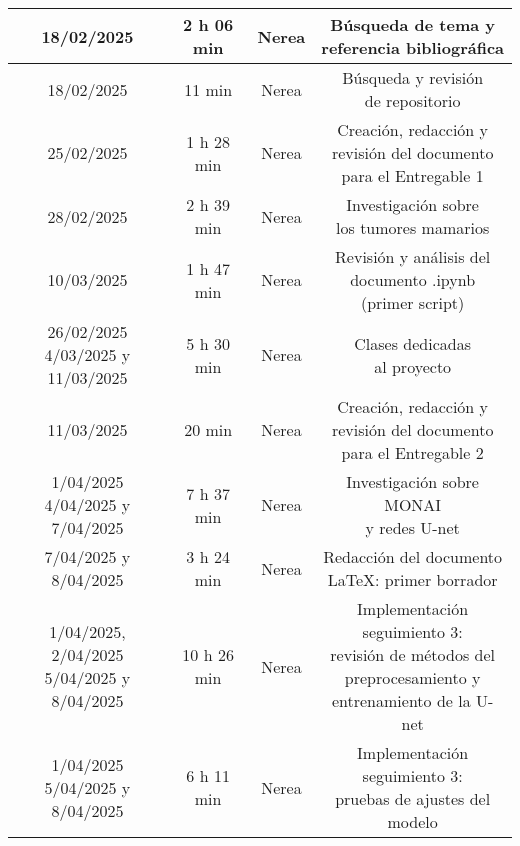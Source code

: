 \documentclass[12pt]{article}
\begin{document}
\begin{longtable}{|c|c|c|c|}
18/02/2025 & 2 h 06 min & Nerea & \makecell{Búsqueda de tema y \\ referencia bibliográfica} \\
\hline
18/02/2025 & 11 min & Nerea & \makecell{Búsqueda y revisión \\ de repositorio} \\
\hline
25/02/2025 & 1 h 28 min & Nerea & \makecell{Creación, redacción y \\ revisión del documento \\ para el Entregable 1} \\
\hline
28/02/2025 & 2 h 39 min & Nerea & \makecell{Investigación sobre \\ los tumores mamarios} \\
\hline
10/03/2025 & 1 h 47 min & Nerea & \makecell{Revisión y análisis del \\ documento .ipynb \\ (primer script)} \\
\hline
\makecell{26/02/2025 \\ 4/03/2025 y 11/03/2025} & 5 h 30 min & Nerea & \makecell{Clases dedicadas \\ al proyecto} \\
\hline
11/03/2025 & 20 min & Nerea & \makecell{Creación, redacción y \\ revisión del documento \\ para el Entregable 2} \\
\hline
\makecell{1/04/2025 \\ 4/04/2025 y 7/04/2025} & 7 h 37 min & Nerea & \makecell{Investigación sobre MONAI \\ y redes U-net} \\
\hline
7/04/2025 y 8/04/2025 & 3 h 24 min & Nerea & \makecell{Redacción del documento \\ LaTeX: primer borrador} \\
\hline
\makecell{1/04/2025, \\ 2/04/2025 \\ 5/04/2025 y \\ 8/04/2025} & 10 h 26 min & Nerea & \makecell{Implementación seguimiento 3: \\ revisión de métodos del \\ preprocesamiento y \\ entrenamiento de la U-net} \\
\hline
\makecell{1/04/2025 \\ 5/04/2025 y 8/04/2025} & 6 h 11 min & Nerea & \makecell{Implementación seguimiento 3: \\ pruebas de ajustes del modelo} \\

\end{longtable}
\end{document}
